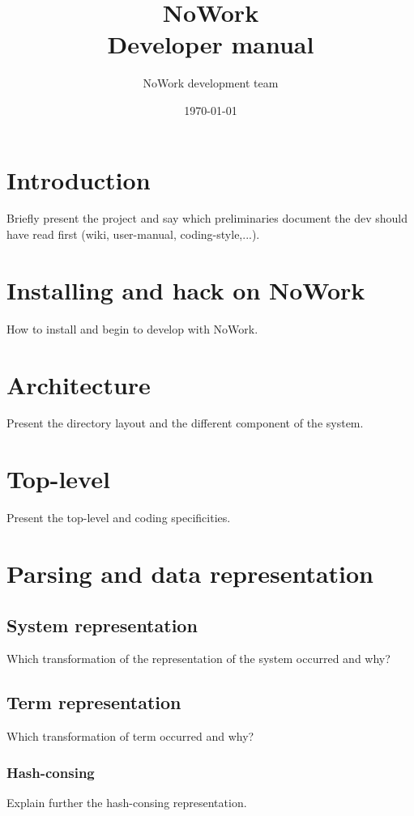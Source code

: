 \documentclass[12pt,a4paper]{article}
\title{NoWork\\
Developer manual}
\author{NoWork development team\\[2em]}
\date\today
\begin{document}
\maketitle

\section{Introduction}

Briefly present the project and say which preliminaries document the dev should have read first (wiki, user-manual, coding-style,...).

\section{Installing and hack on NoWork}

How to install and begin to develop with NoWork.

\section{Architecture}

Present the directory layout and the different component of the system.

\section{Top-level}

Present the top-level and coding specificities.

\section{Parsing and data representation}

\subsection{System representation}

Which transformation of the representation of the system occurred and why?

\subsection{Term representation}

Which transformation of term occurred and why?

\subsubsection{Hash-consing}
Explain further the hash-consing representation.
\end{document}
